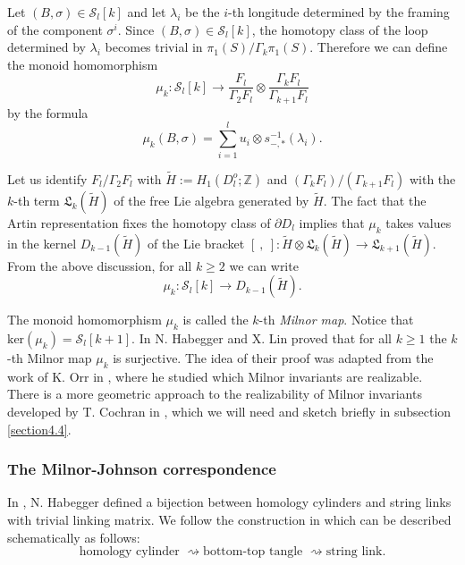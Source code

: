 \documentclass[10pt]{amsart}
\numberwithin{equation}{section}
\numberwithin{equation}{section}
\theoremstyle{definition}
\begin{document}
Let $(B,\sigma)\in \mathcal{S}_l[k]$ and let $\lambda_i$ be the $i$-th longitude determined by the framing of the component $\sigma^i$. Since $(B,\sigma)\in \mathcal{S}_l[k]$, the homotopy class of the loop determined by $\lambda_i$ becomes trivial in $\pi_1(S)/\Gamma_{k}\pi_1(S)$. Therefore we can define the monoid homomorphism
$$ \mu_k: \mathcal{S}_l[k]\longrightarrow \frac{F_l}{\Gamma_2 F_l}\otimes\frac{\Gamma_k F_l}{\Gamma_{k+1}F_l}$$
by the formula
\begin{equation}\label{ecuacion4.5}%
\mu_k(B,\sigma)=\sum_{i=1}^{l} u_i\otimes s_{-,*}^{-1}(\lambda_i).
\end{equation}

Let us identify $F_l/\Gamma_2 F_l$ with $\widetilde{H}:=H_1(D_l^o;\mathbb{Z})$ and $(\Gamma_{k} F_l)/(\Gamma_{k+1} F_l)$ with  the $k$-th term $\mathfrak{L}_{k}(\widetilde{H})$ of the free Lie algebra generated by $\widetilde{H}$. The fact that  the Artin representation fixes the homotopy class of $\partial D_l$ implies that $\mu_k$ takes values in the kernel $D_{k-1}(\widetilde{H})$ of the Lie bracket   $\left[\ ,\ \right]: \widetilde{H}\otimes \mathfrak{L}_{k}(\widetilde{H})\rightarrow\mathfrak{L}_{k+1}(\widetilde{H})$. From the above discussion, for all $k\geq 2$ we can write
\begin{equation}\label{ecuacion4.6}%
\mu_k: \mathcal{S}_l[k]\longrightarrow D_{k-1}(\widetilde{H}).
\end{equation}

The monoid homomorphism $\mu_k$ is called the $k$-th \emph{Milnor map}. Notice that $\text{ker}(\mu_k)=\mathcal{S}_l[k+1]$.  In \cite[Section 1]{MR1620841} N. Habegger and X. Lin proved   that  for all $k\geq1$ the $k$-th  Milnor map $\mu_k$ is surjective. The idea of their proof was adapted from the work of  K. Orr  in  \cite{MR974908}, where he studied which Milnor invariants are realizable. There is a more geometric approach to the realizability of Milnor invariants developed by  T. Cochran in \cite{MR1042041, MR1055569}, which we will need and  sketch briefly in  subsection \ref{section4.4}.

\subsubsection{The Milnor-Johnson correspondence}
In \cite{habegger2000milnor}, N. Habegger defined a bijection between homology cylinders and string links with trivial linking matrix. We follow the construction in \cite{MR2403806} which  can be described schematically as follows:
\begin{equation}\label{procedure}
\text{homology cylinder } \rightsquigarrow \text{bottom-top tangle }  \rightsquigarrow    \text{string  link.}
\end{equation}
\end{document}
